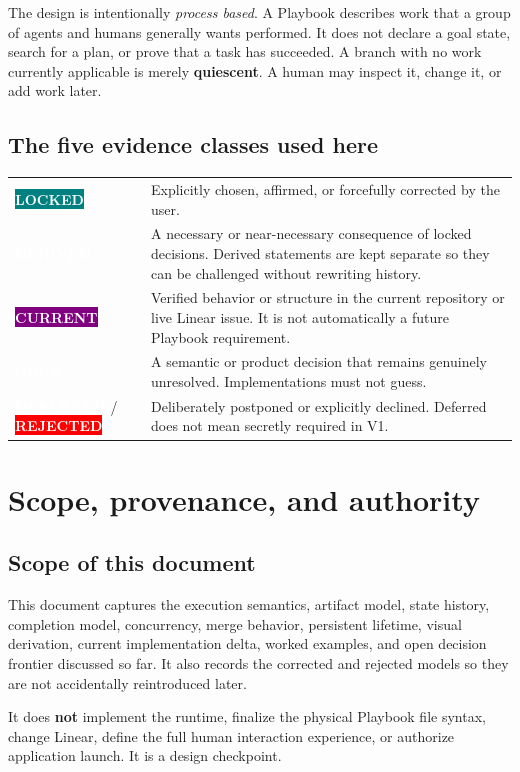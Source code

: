 \documentclass[11pt]{article}
\newcommand{\statuspill}[2]{%
  \begingroup\setlength{\fboxsep}{3pt}%
  \colorbox{#1}{\textcolor{white}{\sffamily\bfseries\scriptsize #2}}%
  \endgroup}
\newcommand{\Locked}{\statuspill{Teal}{LOCKED}}
\newcommand{\Derived}{\statuspill{Accent}{DERIVED}}
\newcommand{\Current}{\statuspill{Purple}{CURRENT}}
\newcommand{\Open}{\statuspill{Amber}{OPEN}}
\newcommand{\Deferred}{\statuspill{Muted}{DEFERRED}}
\newcommand{\Rejected}{\statuspill{Red}{REJECTED}}
\newcommand{\term}[1]{\textbf{#1}}
\begin{document}
The design is intentionally \emph{process based}. A Playbook describes work that a group of agents and humans generally wants performed. It does not declare a goal state, search for a plan, or prove that a task has succeeded. A branch with no work currently applicable is merely \term{quiescent}. A human may inspect it, change it, or add work later.

\subsection{The five evidence classes used here}

\begin{tabularx}{\textwidth}{@{}L{1.05in}Y@{}}
\toprule
\Locked & Explicitly chosen, affirmed, or forcefully corrected by the user. \\
\Derived & A necessary or near-necessary consequence of locked decisions. Derived statements are kept separate so they can be challenged without rewriting history. \\
\Current & Verified behavior or structure in the current repository or live Linear issue. It is not automatically a future Playbook requirement. \\
\Open & A semantic or product decision that remains genuinely unresolved. Implementations must not guess. \\
\Deferred / \Rejected & Deliberately postponed or explicitly declined. Deferred does not mean secretly required in V1. \\
\bottomrule
\end{tabularx}

\section{Scope, provenance, and authority}

\subsection{Scope of this document}

This document captures the execution semantics, artifact model, state history, completion model, concurrency, merge behavior, persistent lifetime, visual derivation, current implementation delta, worked examples, and open decision frontier discussed so far. It also records the corrected and rejected models so they are not accidentally reintroduced later.

It does \textbf{not} implement the runtime, finalize the physical Playbook file syntax, change Linear, define the full human interaction experience, or authorize application launch. It is a design checkpoint.
\end{document}
